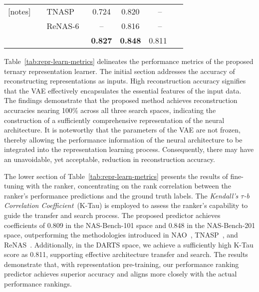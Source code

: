 \documentclass[../main.tex]{subfiles}
\begin{document}
\begin{table}[t]
\begin{NiceTabularX}{\linewidth}{p{6em}lXcccc@{}}[notes]
                                                                   &                                               & TNASP~\cite{DBLP:conf/nips/LuLTYL21}              & 0.724           & 0.820           & --               \\
                                                                   &                                               & ReNAS-6~\cite{DBLP:conf/cvpr/Xu00TJX021}          & --              & 0.816           & --               \\
                                                                   &                                               & \OUR{}                                            & \textbf{0.827}  & \textbf{0.848}  & 0.811~\dartsfn{} \\
    \bottomrule
  \end{NiceTabularX}
\end{table}

Table~\ref{tab:repr-learn-metrics} delineates the performance metrics of the proposed ternary representation learner. The initial section addresses the accuracy of reconstructing representations as inputs. High reconstruction accuracy signifies that the VAE effectively encapsulates the essential features of the input data. The findings demonstrate that the proposed method achieves reconstruction accuracies nearing 100\% across all three search spaces, indicating the construction of a sufficiently comprehensive representation of the neural architecture. It is noteworthy that the parameters of the VAE are not frozen, thereby allowing the performance information of the neural architecture to be integrated into the representation learning process. Consequently, there may have an unavoidable, yet acceptable, reduction in reconstruction accuracy.

The lower section of Table~\ref{tab:repr-learn-metrics} presents the results of fine-tuning with the ranker, concentrating on the rank correlation between the ranker's performance predictions and the ground truth labels.
The \textit{Kendall's \( \tau \)-b Correlation Coefficient}~(K-Tau) is employed to assess the ranker's capability to guide the transfer and search process.
The proposed predictor achieves coefficients of 0.809 in the NAS-Bench-101 space and 0.848 in the NAS-Bench-201 space, outperforming the methodologies introduced in NAO~\cite{DBLP:journals/corr/abs-1712-03351}, TNASP~\cite{E2EPPSun2023}, and ReNAS~\cite{DBLP:conf/cvpr/Xu00TJX021}.
Additionally, in the DARTS space, we achieve a sufficiently high K-Tau score as 0.811, supporting effective architecture transfer and search.
The results demonstrate that, with representation pre-training, our performance ranking predictor achieves superior accuracy and aligns more closely with the actual performance rankings.
\end{document}
